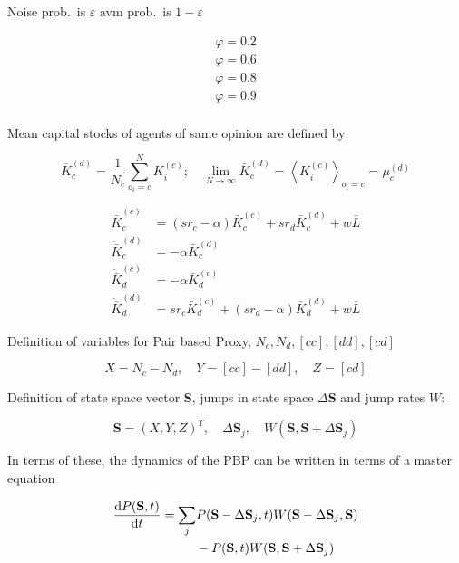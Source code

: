 Noise prob.\ is $\varepsilon$  avm prob.\ is $1 - \varepsilon$

\begin{align}
	\varphi = 0.2 \\ 
	\varphi = 0.6 \\ 
	\varphi = 0.8 \\ 
	\varphi = 0.9 \\ 
\end{align}

Mean capital stocks of agents of same opinion are defined by

\begin{equation}
	\bar{K}_c^{(d)} = \frac{1}{N_c} \sum_{o_i = c}^{N} K_i^{(c)}; \quad \lim_{N \rightarrow \infty} \bar{K}_c^{(d)} = \left< K_i^{(c)} \right>_{o_i=c} = \mu_c^{(d)}
\end{equation}

\begin{align}
	\dot{\bar{K}}_c^{(c)} &= (sr_c - \alpha)\bar{K}_c^{(c)} + s r_d \bar{K}_c^{(d)} + w \bar{L} \nonumber \\
	\dot{\bar{K}}_c^{(d)} &= - \alpha\bar{K}_c^{(d)} \nonumber \\
	\dot{\bar{K}}_d^{(c)} &= - \alpha\bar{K}_d^{(c)} \nonumber \\
	\dot{\bar{K}}_d^{(d)} &= sr_c \bar{K}_d^{(c)} + (s r_d - \alpha)\bar{K}_d^{(d)} + w \bar{L} \nonumber
\end{align}

Definition of variables for Pair based Proxy, $N_c, N_d, [cc], [dd], [cd]$

\begin{equation}
	X = N_c - N_d, \quad Y = [cc] - [dd], \quad Z = [cd]
\end{equation}

Definition of state space vector $\mathbf{S}$, jumps in state space $\Delta \mathbf{S}$ and jump rates $W$:

\begin{equation}
	\mathbf{S} = (X, Y, Z)^T, \quad \Delta \mathbf{S}_j, \quad W(\mathbf{S},\mathbf{S} + \Delta \mathbf{S}_j)
\end{equation}

In terms of these, the dynamics of the PBP can be written in terms of a master equation

\begin{align}
	\frac{{\rm d} P(\mathbf{S}, t)}{{\rm d} t} = \sum_{j} &P(\mathbf{S} - \Delta \mathbf{S}_j, t) W(\mathbf{S} - \Delta \mathbf{S}_j,\mathbf{S}) \nonumber \\
	&- P(\mathbf{S}, t) W(\mathbf{S},\mathbf{S} + \Delta \mathbf{S}_j) \nonumber
\end{align}

